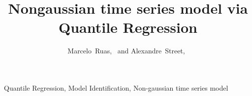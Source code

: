 \documentclass[a4paper]{IEEEtran}
\begin{document}
\title{Nongaussian time series model via Quantile Regression}

\author{Marcelo~Ruas,~
	    and Alexandre~Street,~	


}

\maketitle


\begin{abstract}
	\blindtext
\end{abstract}

\begin{IEEEkeywords}
	Quantile Regression, Model Identification, Non-gaussian time series model
\end{IEEEkeywords}


\listoftodos










%
%
%	
%










\end{document}
